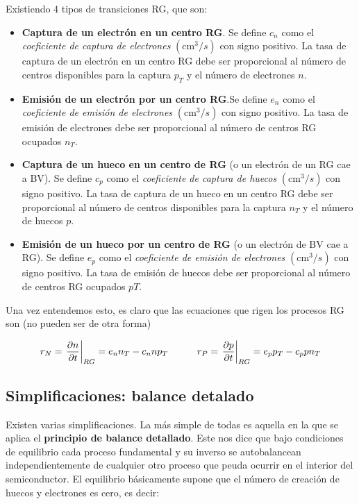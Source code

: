 Existiendo 4 tipos de transiciones RG, que son:

\begin{itemize}
	\item \textbf{Captura de un electrón en un centro RG}. Se define $c_n$ como el \textit{coeficiente de captura de electrones} $(\text{cm}^3/s)$ con signo positivo. La tasa de captura de un electrón en un centro RG debe ser proporcional al número de centros disponibles para la captura $p_T$ y el número de electrones $n$.
	\item \textbf{Emisión de un electrón por un centro RG}.Se define $e_n$ como el \textit{coeficiente de emisión de electrones} $(\text{cm}^3/s)$ con signo positivo. La tasa de emisión de electrones debe ser proporcional al número de centros RG ocupados $n_T$.
	\item \textbf{Captura de un hueco en un centro de RG} (o un electrón de un RG cae a BV). Se define $c_p$ como el \textit{coeficiente de captura de huecos} $(\text{cm}^3/s)$ con signo positivo. La tasa de captura de un hueco en un centro RG debe ser proporcional al número de centros disponibles para la captura $n_T$ y el número de huecos $p$.
	\item \textbf{Emisión de un hueco por un centro de RG} (o un electrón de BV cae a RG). Se define $e_p$ como el \textit{coeficiente de emisión de electrones} $(\text{cm}^3/s)$ con signo positivo. La tasa de emisión de huecos debe ser proporcional al número de centros RG ocupados $pT$.
\end{itemize}
Una vez entendemos esto, es claro que las ecuaciones que rigen los procesos RG son (no pueden ser de otra forma)

\begin{equation}
	r_N = \eval{\parciales{n}{t}}_{RG} = e_n n_T - c_n n p_T \tquad r_P = 	\eval{\parciales{p}{t}}_{RG} = e_pp_T - c_p p n_T
\end{equation}

\subsection{Simplificaciones: balance detalado}

Existen varias simplificaciones. La más simple de todas es aquella en la que se aplica el \textbf{principio de balance detallado}. Este nos dice que bajo condiciones de equilibrio cada proceso fundamental y su inverso se autobalancean independientemente de cualquier otro proceso que peuda ocurrir en el interior del semiconductor. El equilibrio básicamente supone que el número de creación de huecos y electrones es cero, es decir:

